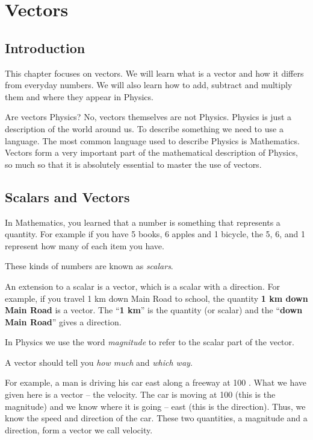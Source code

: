 
\chapter{Vectors}
\label{chap:vectors}

\section{Introduction}
This chapter focuses on vectors. We will learn what is a vector and how it differs from everyday numbers. We will also learn how to add, subtract and multiply them and where they appear in Physics.

Are vectors Physics? No, vectors themselves are not Physics. Physics is just a description of the world around us. To describe something we need to use a language. The most common language used to describe Physics is Mathematics. Vectors form a very important part of the mathematical description of Physics, so much so that it is
absolutely essential to master the use of vectors. 

\section{Scalars and Vectors}
In Mathematics, you learned that a number is something that represents a quantity. For example if you have 5 books, 6 apples and 1 bicycle, the 5, 6, and 1 represent how many of each item you have.

These kinds of numbers are known as \textit{scalars}.


An extension to a scalar is a vector, which is a scalar with a direction. For example, if you travel 1 km down Main Road to school, the quantity \textbf{1 km down Main Road} is a vector. The ``\textbf{1 km}'' is the quantity (or scalar) and the ``\textbf{down Main Road}'' gives a direction. 

In Physics we use the word \textit{magnitude} to refer to the scalar part of the vector.


A vector should tell you \emph{how much} and \emph{which way}. 

For example, a man is driving his car east along a freeway at 100 \kph. What we have given here is a vector -- the velocity. The car is moving at 100 \kph (this is the magnitude) and we know where it is going -- east (this is the direction). Thus, we know the speed and direction of the car. These two quantities, a magnitude and a direction, form a vector we call velocity.

